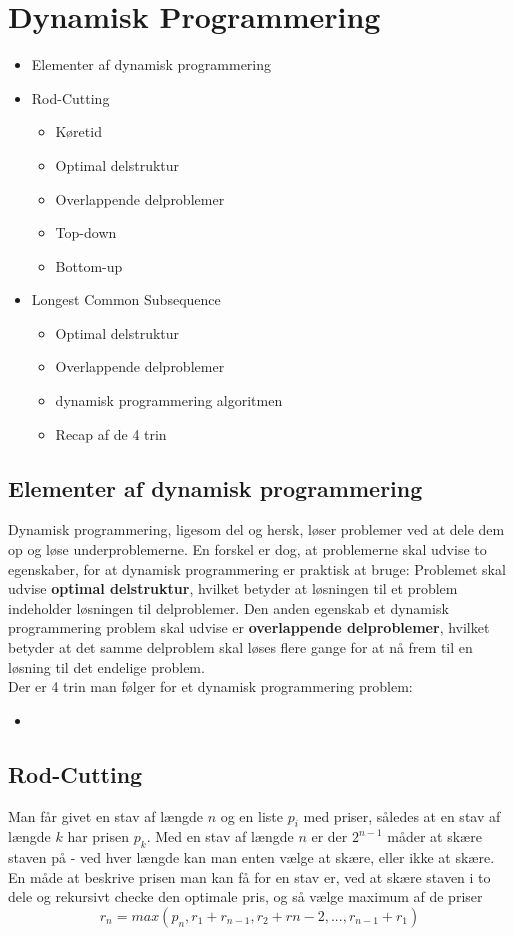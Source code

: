 \section{Dynamisk Programmering}
\hrulefill

\begin{itemize}
\item{Elementer af dynamisk programmering}
\item Rod-Cutting
  \begin{itemize}
  \item Køretid
  \item Optimal delstruktur
  \item Overlappende delproblemer
  \item Top-down
  \item Bottom-up
  \end{itemize}
\item Longest Common Subsequence
  \begin{itemize}
  \item Optimal delstruktur
  \item Overlappende delproblemer
  \item dynamisk programmering algoritmen
  \item Recap af de 4 trin
  \end{itemize}
\end{itemize}

\newpage
\subsection{Elementer af dynamisk programmering}
Dynamisk programmering, ligesom del og hersk, løser problemer ved at dele dem op og løse underproblemerne. En forskel er dog, at problemerne skal udvise to egenskaber, for at dynamisk programmering er praktisk at bruge: Problemet skal udvise \textbf{optimal delstruktur}, hvilket betyder at løsningen til et problem indeholder løsningen til delproblemer. Den anden egenskab et dynamisk programmering problem skal udvise er \textbf{overlappende delproblemer}, hvilket betyder at det samme delproblem skal løses flere gange for at nå frem til en løsning til det endelige problem.\\

Der er 4 trin man følger for et dynamisk programmering problem:
\begin{itemize}
\item 
\end{itemize}

\subsection{Rod-Cutting}
Man får givet en stav af længde $n$ og en liste $p_i$ med priser, således at en stav af længde $k$ har prisen $p_k$. Med en stav af længde $n$ er der $2^{n-1}$ måder at skære staven på - ved hver længde kan man enten vælge at skære, eller ikke at skære.\\
En måde at beskrive prisen man kan få for en stav er, ved at skære staven i to dele og rekursivt checke den optimale pris, og så vælge maximum af de priser
$$r_n = max(p_n, r_1 + r_{n - 1}, r_2 + r{n - 2}, ..., r_{n - 1} + r_1)$$

